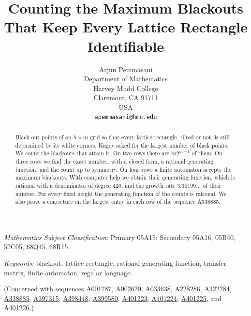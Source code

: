 \documentclass[12pt]{article}
\title{Counting the Maximum Blackouts That Keep Every Lattice Rectangle Identifiable}
\author{Arjun Pemmasani\\
Department of Mathematics\\
Harvey Mudd College\\
Claremont, CA 91711\\
USA\\
\texttt{apemmasani@hmc.edu}}
\date{}
\theoremstyle{plain}
\theoremstyle{definition}
\theoremstyle{remark}
\newcommand{\seqnum}[1]{\href{https://oeis.org/#1}{\rm \underline{#1}}}
\begin{document}
\maketitle

\begin{abstract}
Black out points of an $h\times m$ grid so that every lattice rectangle, tilted
or not, is still determined by its white corners. Kagey asked for the largest
number of black points. We count the blackouts that attain it. On two rows
there are $m2^{m-1}$ of them. On three rows we find the exact number, with a
closed form, a rational generating function, and the count up to symmetry. On
four rows a finite automaton accepts the maximum blackouts. With computer help
we obtain their generating function, which is rational with a denominator of
degree $420$, and the growth rate $3.35199\ldots$ of their number. For every
fixed height the generating function of the counts is rational. We also prove
a conjecture on the largest entry in each row of the sequence A338885.
\end{abstract}














 {\it Mathematics Subject Classification}: Primary 05A15; Secondary
05A16, 05B40, 52C05, 68Q45, 68R15.

\noindent \emph{Keywords:} blackout, lattice rectangle, rational generating function,
transfer matrix, finite automaton, regular language.

\noindent (Concerned with sequences
\seqnum{A001787},
\seqnum{A002620},
\seqnum{A033638},
\seqnum{A228286},
\seqnum{A322284},
\seqnum{A338885},
\seqnum{A397315},
\seqnum{A398448},
\seqnum{A399580},
\seqnum{A401223},
\seqnum{A401224},
\seqnum{A401225}, and
\seqnum{A401226}.)
\end{document}
